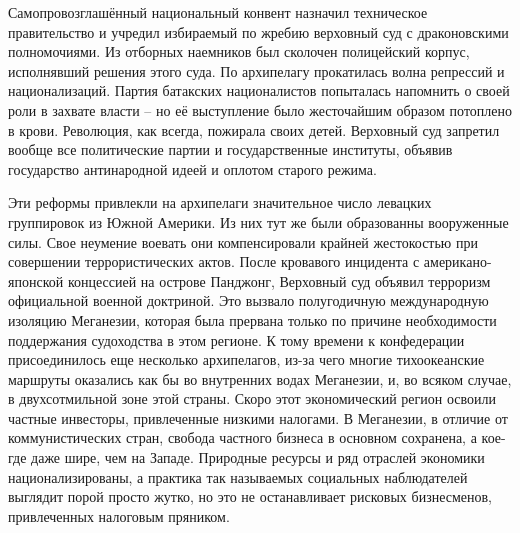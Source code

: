 \documentclass[10pt,final]{book}
\begin{document}
Самопровозглашённый национальный конвент назначил техническое правительство и учредил избираемый по жребию верховный суд с драконовскими полномочиями. Из отборных наемников был сколочен полицейский корпус, исполнявший решения этого суда. По архипелагу прокатилась волна репрессий и национализаций. Партия батакских националистов попыталась напомнить о своей роли в захвате власти -- но её выступление было жесточайшим образом потоплено в крови. Революция, как всегда, пожирала своих детей. Верховный суд запретил вообще все политические партии и государственные институты, объявив государство антинародной идеей и оплотом старого режима.

Эти реформы привлекли на архипелаги значительное число левацких группировок из Южной Америки. Из них тут же были образованны вооруженные силы. Свое неумение воевать они компенсировали крайней жестокостью при совершении террористических актов. После кровавого инцидента с американо-японской концессией на острове Панджонг, Верховный суд объявил терроризм официальной военной доктриной. Это вызвало полугодичную международную изоляцию Меганезии, которая была прервана только по причине необходимости поддержания судоходства в этом регионе. К тому времени к конфедерации присоединилось еще несколько архипелагов, из-за чего многие тихоокеанские маршруты оказались как бы во внутренних водах Меганезии, и, во всяком случае, в двухсотмильной зоне этой страны. Скоро этот экономический регион освоили частные инвесторы, привлеченные низкими налогами. В Меганезии, в отличие от коммунистических стран, свобода частного бизнеса в основном сохранена, а кое-где даже шире, чем на Западе. Природные ресурсы и ряд отраслей экономики национализированы, а практика так называемых социальных наблюдателей выглядит порой просто жутко, но это не останавливает рисковых бизнесменов, привлеченных налоговым пряником.
\end{document}

